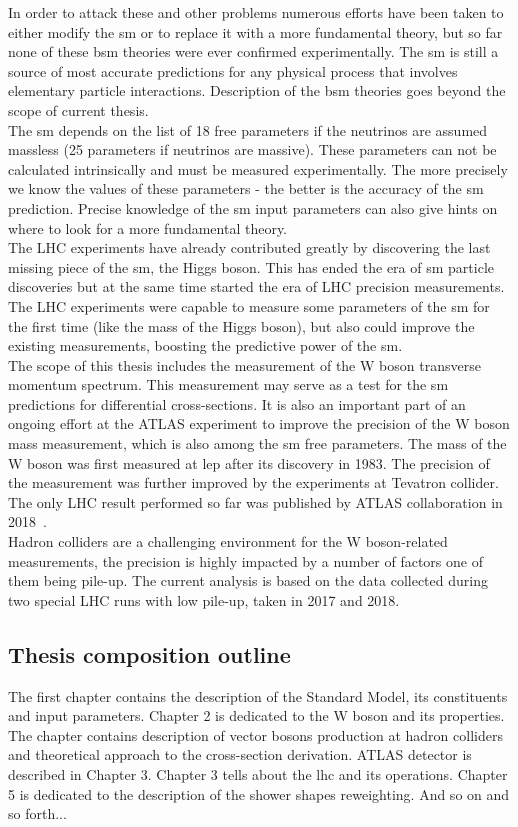 In order to attack these and other problems numerous efforts have been taken to either modify the \gls{sm} or to replace it with a more fundamental theory, but so far none of these \gls{bsm} theories were ever confirmed experimentally. The \gls{sm} is still a source of most accurate predictions for any physical process that involves elementary particle interactions. Description of the \gls{bsm} theories goes beyond the scope of current thesis. \\
The \gls{sm} depends on the list of 18 free parameters if the neutrinos are assumed massless (25 parameters if neutrinos are massive). These parameters can not be calculated intrinsically and must be measured experimentally. The more precisely we know the values of these parameters - the better is the accuracy of the \gls{sm} prediction. Precise knowledge of the \gls{sm} input parameters can also give hints on where to look for a more fundamental theory. \\
The LHC experiments have already contributed greatly by discovering the last missing piece of the \gls{sm}, the Higgs boson. This has ended the era of \gls{sm} particle discoveries but at the same time started the era of LHC precision measurements. The LHC experiments were capable to measure some parameters of the \gls{sm} for the first time (like the mass of the Higgs boson), but also could improve the existing measurements, boosting the predictive power of the \gls{sm}. \\
The scope of this thesis includes the measurement of the W boson transverse momentum spectrum. This measurement may serve as a test for the \gls{sm} predictions for differential cross-sections. It is also an important part of an ongoing effort at the ATLAS experiment to improve the precision of the W boson mass measurement, which is also among the \gls{sm} free parameters. The mass of the W boson was first measured at \gls{lep} after its discovery in 1983. The precision of the measurement was further improved by the experiments at Tevatron collider. The only LHC result performed so far was published by ATLAS collaboration in 2018~\cite{wboson}.\\
Hadron colliders are a challenging environment for the W boson-related measurements, the precision is highly impacted by a number of factors one of them being pile-up. The current analysis is based on the data collected during two special LHC runs with low pile-up, taken in 2017 and 2018.  

\subsection{Thesis composition outline}
The first chapter contains the description of the Standard Model, its constituents and input parameters. Chapter 2 is dedicated to the W boson and its properties. The chapter contains description of vector bosons production at hadron colliders and theoretical approach to the cross-section derivation. ATLAS detector is described in Chapter 3. Chapter 3 tells about the \gls{lhc} and its operations. Chapter 5 is dedicated to the description of the shower shapes reweighting. And so on and so forth...